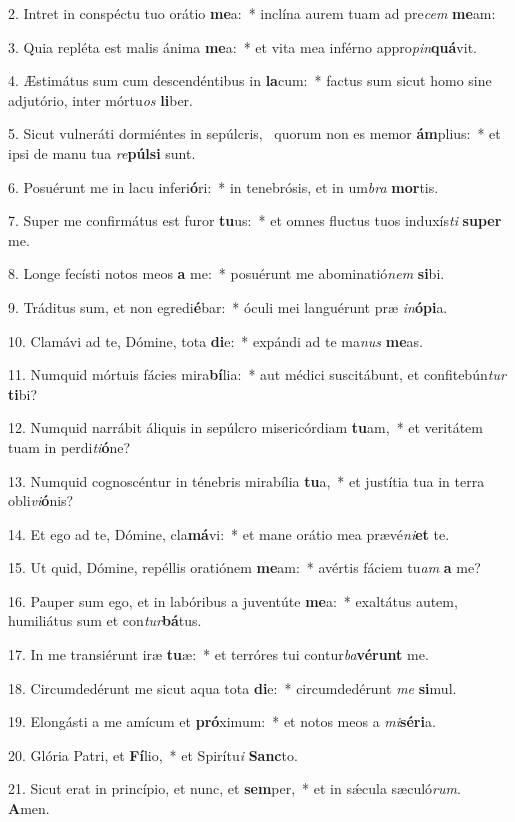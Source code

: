 2. Intret in conspéctu tuo orátio \textbf{me}a:~*  inclína aurem tuam ad pre\textit{cem} \textbf{me}am:\

3. Quia repléta est malis ánima \textbf{me}a:~*  et vita mea inférno appro\textit{pin}\textbf{quá}vit.\

4. Æstimátus sum cum descendéntibus in \textbf{la}cum:~*  factus sum sicut homo sine adjutório, inter mórtu\textit{os} \textbf{li}ber.\

5. Sicut vulneráti dormiéntes in sepúlcris, \dag\  quorum non es memor \textbf{ám}plius:~*  et ipsi de manu tua \textit{re}\textbf{púl}\textbf{si} sunt.\

6. Posuérunt me in lacu inferi\textbf{ó}ri:~*  in tenebrósis, et in um\textit{bra} \textbf{mor}tis.\

7. Super me confirmátus est furor \textbf{tu}us:~*  et omnes fluctus tuos induxís\textit{ti} \textbf{su}\textbf{per} me.\

8. Longe fecísti notos meos \textbf{a} me:~*  posuérunt me abominatió\textit{nem} \textbf{si}bi.\

9. Tráditus sum, et non egredi\textbf{é}bar:~*  óculi mei languérunt præ \textit{in}\textbf{ó}\textbf{pi}a.\

10. Clamávi ad te, Dómine, tota \textbf{di}e:~*  expándi ad te ma\textit{nus} \textbf{me}as.\

11. Numquid mórtuis fácies mira\textbf{bí}lia:~*  aut médici suscitábunt, et confitebún\textit{tur} \textbf{ti}bi?\

12. Numquid narrábit áliquis in sepúlcro misericórdiam \textbf{tu}am,~*  et veritátem tuam in perdi\textit{ti}\textbf{ó}ne?\

13. Numquid cognoscéntur in ténebris mirabília \textbf{tu}a,~*  et justítia tua in terra obli\textit{vi}\textbf{ó}nis?\

14. Et ego ad te, Dómine, cla\textbf{má}vi:~*  et mane orátio mea prævé\textit{ni}\textbf{et} te.\

15. Ut quid, Dómine, repéllis oratiónem \textbf{me}am:~*  avértis fáciem tu\textit{am} \textbf{a} me?\

16. Pauper sum ego, et in labóribus a juventúte \textbf{me}a:~*  exaltátus autem, humiliátus sum et con\textit{tur}\textbf{bá}tus.\

17. In me transiérunt iræ \textbf{tu}æ:~*  et terróres tui contur\textit{ba}\textbf{vé}\textbf{runt} me.\

18. Circumdedérunt me sicut aqua tota \textbf{di}e:~*  circumdedérunt \textit{me} \textbf{si}mul.\

19. Elongásti a me amícum et \textbf{pró}ximum:~*  et notos meos a \textit{mi}\textbf{sé}\textbf{ri}a.\

20. Glória Patri, et \textbf{Fí}lio,~*  et Spirítu\textit{i} \textbf{Sanc}to.\

21. Sicut erat in princípio, et nunc, et \textbf{sem}per,~*  et in sǽcula sæculó\textit{rum}. \textbf{A}men.\

